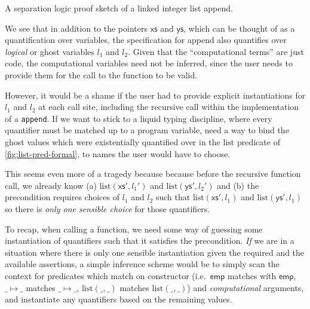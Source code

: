 \begin{marginfigure}
    \inputminted[breaklines,mathescape,fontsize=\small]{py}{code/append_annot.py}
    \caption{A separation logic proof sketch of a linked integer list
        append.}\label{fig:append-annot-formal}
\end{marginfigure}

We see that in addition to the pointers $\mathsf{xs}$ and $\mathsf{ys}$, which
can be thought of as a quantification over  variables, the
specification for append also quantifies over \emph{logical} or ghost variables
$l_1$ and $l_2$. Given that the ``computational terms'' are just code, the
computational variables need not be inferred, since the user needs to provide
them for the call to the function to be valid.

However, it would be a shame if the user had to provide explicit instantiations
for $l_1$ and $l_2$ at each call site, including the recursive call within the
implementation of a \texttt{append}. If we want to stick to a liquid
typing discipline, where every quantifier must be matched up to a program
variable, need a way to bind the ghost values which were existentially
quantified over in the $\mathrm{list}$ predicate of
\cref{fig:list-pred-formal}, to names the user would have to choose.

This seems even more of a tragedy because because before the recursive function
call, we already know (a) $\mathrm{list}(\mathsf{xs}', l_1')$ and
$\mathrm{list}(\mathsf{ys}', l_2')$ and (b) the precondition requires choices
of $l_1$ and $l_2$ such that $\mathrm{list}(\mathsf{xs}', l_1)$ and
$\mathrm{list}(\mathsf{ys}', l_1)$ so there is \emph{only one sensible choice}
for those quantifiers.

To recap, when calling a function, we need some way of guessing some
instantiation of quantifiers such that it satisfies the precondition. \emph{If}
we are in a situation where there is only one sensible instantiation given the
required and the available assertions, a simple inference scheme would be to
simply scan the context for predicates which match on constructor (i.e.\
$\mathsf{emp}$ matches with $\mathsf{emp}$, $\_ \mapsto{} \_$ matches $\_
\mapsto{} \_$, $\mathrm{list(\_, \_)}$ matches $\mathrm{list}(\_, \_)$) and
\emph{computational} arguments, and instantiate any quantifiers based on the
remaining values.

